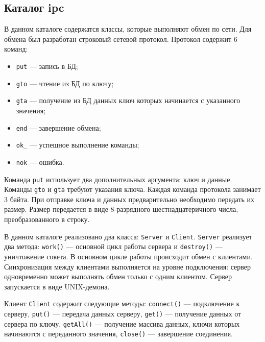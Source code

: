 \subsection{Каталог ipc}
В данном каталоге содержатся классы, которые выполняют обмен по сети. Для обмена был разработан строковый сетевой протокол. Протокол содержит 6 команд: 
\begin{itemize}
\item \texttt{put} --- запись в БД;
\item \texttt{gto} --- чтение из БД по ключу;
\item \texttt{gta} --- получение из БД данных ключ которых начинается с указанного значения;
\item \texttt{end} --- завершение обмена;
\item \texttt{ok_} --- успешное выполнение команды;
\item \texttt{nok} --- ошибка.
\end{itemize}
Команда \texttt{put} использует два дополнительных аргумента: ключ и данные. Команды \texttt{gto} и \texttt{gta} требуют указания ключа. Каждая команда протокола занимает 3 байта. При отправке ключа и данных предварительно необходимо передать их размер. Размер передается в виде 8-разрядного шестнадцатеричного числа, преобразованного в строку.

В данном каталоге реализовано два класса: \texttt{Server} и \texttt{Client}. \texttt{Server} реализует два метода: \texttt{work()} --- основной цикл работы сервера и \texttt{destroy()} --- уничтожение сокета. В основном цикле работы происходит обмен с клиентами. Синхронизация между клиентами выполняется на уровне подключения: сервер одновременно может выполнять обмен только с одним клиентом. Сервер запускается в виде UNIX-демона.

Клиент \texttt{Client} содержит следующие методы: \texttt{connect()} --- подключение к серверу, \texttt{put()} --- передача данных серверу, \texttt{get()} --- получение данных от сервера по ключу, \texttt{getAll()} --- получение массива данных, ключи которых начинаются с переданного значения, \texttt{close()} --- завершение соединения.


